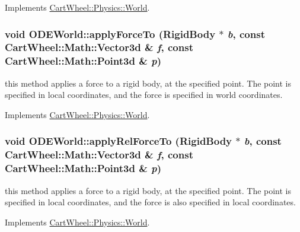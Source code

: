 Implements \hyperlink{classCartWheel_1_1Physics_1_1World_a289b113bee05b81baecebe76bc384069}{CartWheel::Physics::World}.

\hypertarget{classCartWheel_1_1Physics_1_1ODEWorld_a7a8c8fc31b0dac181d6d397cd6b70e06}{
\subsubsection[{applyForceTo}]{\setlength{\rightskip}{0pt plus 5cm}void ODEWorld::applyForceTo ({\bf RigidBody} $\ast$ {\em b}, \/  const {\bf CartWheel::Math::Vector3d} \& {\em f}, \/  const {\bf CartWheel::Math::Point3d} \& {\em p})}}
\label{classCartWheel_1_1Physics_1_1ODEWorld_a7a8c8fc31b0dac181d6d397cd6b70e06}
this method applies a force to a rigid body, at the specified point. The point is specified in local coordinates, and the force is specified in world coordinates. 

Implements \hyperlink{classCartWheel_1_1Physics_1_1World_a26058e4671390ada9b3d3b1590f88f1a}{CartWheel::Physics::World}.

\hypertarget{classCartWheel_1_1Physics_1_1ODEWorld_a3403766a4fa655a7b2d0df7a409a990e}{
\subsubsection[{applyRelForceTo}]{\setlength{\rightskip}{0pt plus 5cm}void ODEWorld::applyRelForceTo ({\bf RigidBody} $\ast$ {\em b}, \/  const {\bf CartWheel::Math::Vector3d} \& {\em f}, \/  const {\bf CartWheel::Math::Point3d} \& {\em p})}}
\label{classCartWheel_1_1Physics_1_1ODEWorld_a3403766a4fa655a7b2d0df7a409a990e}
this method applies a force to a rigid body, at the specified point. The point is specified in local coordinates, and the force is also specified in local coordinates. 

Implements \hyperlink{classCartWheel_1_1Physics_1_1World_a87da6dd55397da4ceceaa457be2e1a89}{CartWheel::Physics::World}.

